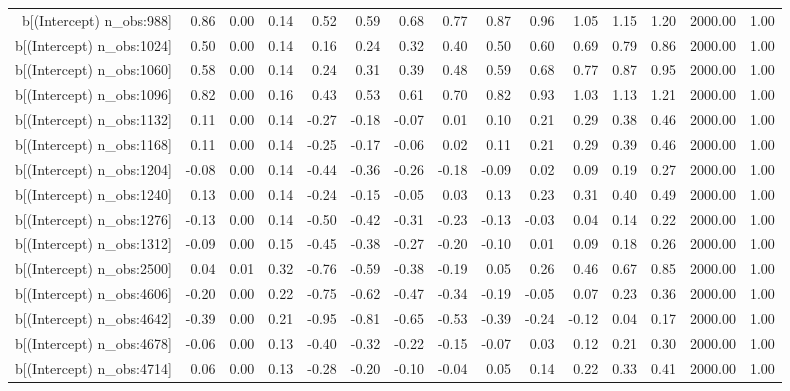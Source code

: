 \begin{table}[ht]
\begin{tabular}{rrrrrrrrrrrrrrr}
  b[(Intercept) n\_obs:988] & 0.86 & 0.00 & 0.14 & 0.52 & 0.59 & 0.68 & 0.77 & 0.87 & 0.96 & 1.05 & 1.15 & 1.20 & 2000.00 & 1.00 \\ 
  b[(Intercept) n\_obs:1024] & 0.50 & 0.00 & 0.14 & 0.16 & 0.24 & 0.32 & 0.40 & 0.50 & 0.60 & 0.69 & 0.79 & 0.86 & 2000.00 & 1.00 \\ 
  b[(Intercept) n\_obs:1060] & 0.58 & 0.00 & 0.14 & 0.24 & 0.31 & 0.39 & 0.48 & 0.59 & 0.68 & 0.77 & 0.87 & 0.95 & 2000.00 & 1.00 \\ 
  b[(Intercept) n\_obs:1096] & 0.82 & 0.00 & 0.16 & 0.43 & 0.53 & 0.61 & 0.70 & 0.82 & 0.93 & 1.03 & 1.13 & 1.21 & 2000.00 & 1.00 \\ 
  b[(Intercept) n\_obs:1132] & 0.11 & 0.00 & 0.14 & -0.27 & -0.18 & -0.07 & 0.01 & 0.10 & 0.21 & 0.29 & 0.38 & 0.46 & 2000.00 & 1.00 \\ 
  b[(Intercept) n\_obs:1168] & 0.11 & 0.00 & 0.14 & -0.25 & -0.17 & -0.06 & 0.02 & 0.11 & 0.21 & 0.29 & 0.39 & 0.46 & 2000.00 & 1.00 \\ 
  b[(Intercept) n\_obs:1204] & -0.08 & 0.00 & 0.14 & -0.44 & -0.36 & -0.26 & -0.18 & -0.09 & 0.02 & 0.09 & 0.19 & 0.27 & 2000.00 & 1.00 \\ 
  b[(Intercept) n\_obs:1240] & 0.13 & 0.00 & 0.14 & -0.24 & -0.15 & -0.05 & 0.03 & 0.13 & 0.23 & 0.31 & 0.40 & 0.49 & 2000.00 & 1.00 \\ 
  b[(Intercept) n\_obs:1276] & -0.13 & 0.00 & 0.14 & -0.50 & -0.42 & -0.31 & -0.23 & -0.13 & -0.03 & 0.04 & 0.14 & 0.22 & 2000.00 & 1.00 \\ 
  b[(Intercept) n\_obs:1312] & -0.09 & 0.00 & 0.15 & -0.45 & -0.38 & -0.27 & -0.20 & -0.10 & 0.01 & 0.09 & 0.18 & 0.26 & 2000.00 & 1.00 \\ 
  b[(Intercept) n\_obs:2500] & 0.04 & 0.01 & 0.32 & -0.76 & -0.59 & -0.38 & -0.19 & 0.05 & 0.26 & 0.46 & 0.67 & 0.85 & 2000.00 & 1.00 \\ 
  b[(Intercept) n\_obs:4606] & -0.20 & 0.00 & 0.22 & -0.75 & -0.62 & -0.47 & -0.34 & -0.19 & -0.05 & 0.07 & 0.23 & 0.36 & 2000.00 & 1.00 \\ 
  b[(Intercept) n\_obs:4642] & -0.39 & 0.00 & 0.21 & -0.95 & -0.81 & -0.65 & -0.53 & -0.39 & -0.24 & -0.12 & 0.04 & 0.17 & 2000.00 & 1.00 \\ 
  b[(Intercept) n\_obs:4678] & -0.06 & 0.00 & 0.13 & -0.40 & -0.32 & -0.22 & -0.15 & -0.07 & 0.03 & 0.12 & 0.21 & 0.30 & 2000.00 & 1.00 \\ 
  b[(Intercept) n\_obs:4714] & 0.06 & 0.00 & 0.13 & -0.28 & -0.20 & -0.10 & -0.04 & 0.05 & 0.14 & 0.22 & 0.33 & 0.41 & 2000.00 & 1.00 \\ 

\end{tabular}
\end{table}
